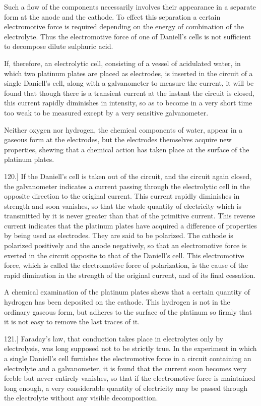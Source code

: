 \documentclass[12pt,oneside]{book}[2021/10/04]
\newcommand{\Runhead}[1]{\fancyhead[C]{\iffloatpage{}{\small#1}}}
\newcommand{\article}[1]{\phantomsection \label{art:#1}{#1.]}}
\newcommand{\¬}{\hphantom{0}}
\begin{document}
\label{art:119a}
Such a flow of the components necessarily involves their appearance
in a separate form at the anode and the cathode. To effect
this separation a certain electromotive force is required depending
on the energy of combination of the electrolyte. Thus the electromotive
force of one of Daniell's cells is not sufficient to decompose
dilute sulphuric acid.

If, therefore, an electrolytic cell, consisting of a vessel of
acidulated water, in which two platinum plates are placed as
electrodes, is inserted in the circuit of a single Daniell's cell, along
with a galvanometer to measure the current, it will be found that
though there is a transient current at the instant the circuit is
closed, this current rapidly diminishes in intensity, so as to become
in a very short time too weak to be measured except by a very
sensitive galvanometer.

Neither oxygen nor hydrogen, the chemical components of water,
appear in a gaseous form at the electrodes, but the electrodes themselves
acquire new properties, shewing that a chemical action has
taken place at the surface of the platinum plates.

\article{120} If the Daniell's cell is taken out of the circuit, and the
circuit again closed, the galvanometer indicates a current passing
through the electrolytic cell in the opposite direction to the original
current. This current rapidly diminishes in strength and soon
vanishes, so that the whole quantity of electricity which is transmitted
by it is never greater than that of the primitive current.
This reverse current indicates that the platinum plates have acquired
a difference of properties by being used as electrodes. They
are said to be polarized. The cathode is polarized positively and
the anode negatively, so that an electromotive force is exerted in
the circuit opposite to that of the Daniell's cell. This electromotive
force, which is called the electromotive force of polarization, is the
cause of the rapid diminution in the strength of the original current,
and of its final cessation.
\Runhead{POLARIZATION.}

A chemical examination of the platinum plates shews that a
certain quantity of hydrogen has been deposited on the cathode.
This hydrogen is not in the ordinary gaseous form, but adheres to
the surface of the platinum so firmly that it is not easy to remove
the last traces of it.

\article{121} Faraday's law, that conduction takes place in electrolytes
only by electrolysis, was long supposed not to be strictly true.
In the experiment in which a single Daniell's cell furnishes the
electromotive force in a circuit containing an electrolyte and a
galvanometer, it is found that the current soon becomes very feeble
but never entirely vanishes, so that if the electromotive force is
maintained long enough, a very considerable quantity of electricity
may be passed through the electrolyte without any visible decomposition.
\end{document}
